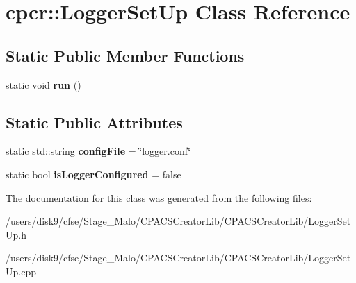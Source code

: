 \hypertarget{classcpcr_1_1LoggerSetUp}{\section{cpcr\-:\-:Logger\-Set\-Up Class Reference}
\label{classcpcr_1_1LoggerSetUp}
}
\subsection*{Static Public Member Functions}
\begin{DoxyCompactItemize}
\item 
\hypertarget{classcpcr_1_1LoggerSetUp_a60367fa6ae818ccfdbf0f74fec5ba18b}{static void {\bfseries run} ()}\label{classcpcr_1_1LoggerSetUp_a60367fa6ae818ccfdbf0f74fec5ba18b}

\end{DoxyCompactItemize}
\subsection*{Static Public Attributes}
\begin{DoxyCompactItemize}
\item 
\hypertarget{classcpcr_1_1LoggerSetUp_a3865ac13df9d960e86afa33aa54fc400}{static std\-::string {\bfseries config\-File} = \char`\"{}logger.\-conf\char`\"{}}\label{classcpcr_1_1LoggerSetUp_a3865ac13df9d960e86afa33aa54fc400}

\item 
\hypertarget{classcpcr_1_1LoggerSetUp_a60d32b6b7c29aa3473a2cb56fe90564b}{static bool {\bfseries is\-Logger\-Configured} = false}\label{classcpcr_1_1LoggerSetUp_a60d32b6b7c29aa3473a2cb56fe90564b}

\end{DoxyCompactItemize}


The documentation for this class was generated from the following files\-:\begin{DoxyCompactItemize}
\item 
/users/disk9/cfse/\-Stage\-\_\-\-Malo/\-C\-P\-A\-C\-S\-Creator\-Lib/\-C\-P\-A\-C\-S\-Creator\-Lib/Logger\-Set\-Up.\-h\item 
/users/disk9/cfse/\-Stage\-\_\-\-Malo/\-C\-P\-A\-C\-S\-Creator\-Lib/\-C\-P\-A\-C\-S\-Creator\-Lib/Logger\-Set\-Up.\-cpp\end{DoxyCompactItemize}
